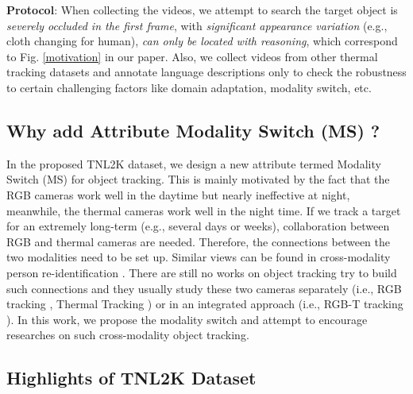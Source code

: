 \documentclass[final]{cvpr}
\begin{document}
\textbf{Protocol}: When collecting the videos, we attempt to search the target object is \emph{severely occluded in the first frame}, with \emph{significant appearance variation} (e.g., cloth changing for human),  \emph{can only be located with reasoning}, which correspond to Fig. \ref{motivation} in our paper. Also, we collect videos from other thermal tracking datasets and annotate language descriptions only to check the robustness to certain challenging factors like domain adaptation, modality switch, etc. 

 




 
\subsection{Why add Attribute Modality Switch (MS) ?} 
In the proposed TNL2K dataset, we design a new attribute termed Modality Switch (MS) for object tracking. This is mainly motivated by the fact that the RGB cameras work well in the daytime but nearly ineffective at night, meanwhile, the thermal cameras work well in the night time. If we track a target for an extremely long-term (e.g., several days or weeks), collaboration between RGB and thermal cameras are needed. Therefore, the connections between the two modalities need to be set up. Similar views can be found in cross-modality person re-identification \cite{wu2017rgbinfraredreid, wu2020rgbirreid}. There are still no works on object tracking try to build such connections and they usually study these two cameras separately (i.e., RGB tracking \cite{Wu2013Online, fan2019lasot, Wang_2018_CVPR}, Thermal Tracking \cite{liu2019ptbtracking}) or in an integrated approach (i.e., RGB-T tracking \cite{li2019rgbt234}). In this work, we propose the modality switch and attempt to encourage researches on such cross-modality object tracking. 




\subsection{Highlights of TNL2K Dataset} 


 
\end{document}
